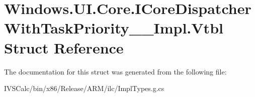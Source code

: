 \hypertarget{struct_windows_1_1_u_i_1_1_core_1_1_i_core_dispatcher_with_task_priority_____impl_1_1_vtbl}{}\section{Windows.\+U\+I.\+Core.\+I\+Core\+Dispatcher\+With\+Task\+Priority\+\_\+\+\_\+\+Impl.\+Vtbl Struct Reference}
\label{struct_windows_1_1_u_i_1_1_core_1_1_i_core_dispatcher_with_task_priority_____impl_1_1_vtbl}


The documentation for this struct was generated from the following file\+:\begin{DoxyCompactItemize}
\item 
I\+V\+S\+Calc/bin/x86/\+Release/\+A\+R\+M/ilc/Impl\+Types.\+g.\+cs\end{DoxyCompactItemize}
